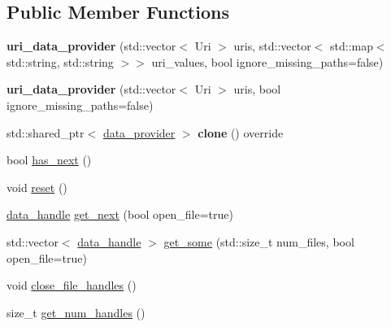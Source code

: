 \subsection*{Public Member Functions}
\begin{DoxyCompactItemize}
\item 
\mbox{\label{classral_1_1io_1_1uri__data__provider_a8fae6bcd15526167bff4db8b55983cf5}} 
{\bfseries uri\+\_\+data\+\_\+provider} (std\+::vector$<$ Uri $>$ uris, std\+::vector$<$ std\+::map$<$ std\+::string, std\+::string $>$$>$ uri\+\_\+values, bool ignore\+\_\+missing\+\_\+paths=false)
\item 
\mbox{\label{classral_1_1io_1_1uri__data__provider_afe82d9a1af9cc7718bfc5e1168821ebb}} 
{\bfseries uri\+\_\+data\+\_\+provider} (std\+::vector$<$ Uri $>$ uris, bool ignore\+\_\+missing\+\_\+paths=false)
\item 
\mbox{\label{classral_1_1io_1_1uri__data__provider_a6a1f9ddcfc0337174d2d6e25e21423c0}} 
std\+::shared\+\_\+ptr$<$ \hyperlink{classral_1_1io_1_1data__provider}{data\+\_\+provider} $>$ {\bfseries clone} () override
\item 
bool \hyperlink{classral_1_1io_1_1uri__data__provider_a1815b5e9fa0b323b0cf9c0ff932a1c4b}{has\+\_\+next} ()
\item 
void \hyperlink{classral_1_1io_1_1uri__data__provider_aaab8f4f12a00b546a4cc01260d9199c8}{reset} ()
\item 
\hyperlink{structral_1_1io_1_1data__handle}{data\+\_\+handle} \hyperlink{classral_1_1io_1_1uri__data__provider_a189c193c14fdabc3dd84dca1385688d0}{get\+\_\+next} (bool open\+\_\+file=true)
\item 
std\+::vector$<$ \hyperlink{structral_1_1io_1_1data__handle}{data\+\_\+handle} $>$ \hyperlink{classral_1_1io_1_1uri__data__provider_a53be24f2a445940e82c15b324c7b7c5f}{get\+\_\+some} (std\+::size\+\_\+t num\+\_\+files, bool open\+\_\+file=true)
\item 
void \hyperlink{classral_1_1io_1_1uri__data__provider_afb66fcd6bc0ac46a75d195f160f9ec45}{close\+\_\+file\+\_\+handles} ()
\item 
size\+\_\+t \hyperlink{classral_1_1io_1_1uri__data__provider_a89a2e8bd07ce00025d62e877ae56a871}{get\+\_\+num\+\_\+handles} ()
\end{DoxyCompactItemize}


